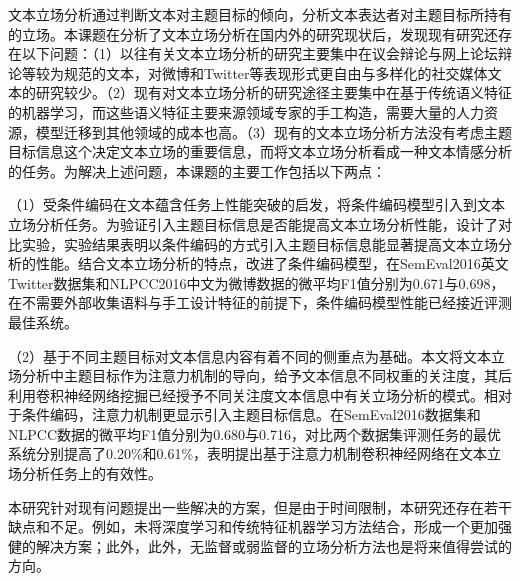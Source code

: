 

文本立场分析通过判断文本对主题目标的倾向，分析文本表达者对主题目标所持有的立场。本课题在分析了文本立场分析在国内外的研究现状后，发现现有研究还存在以下问题：（1）以往有关文本立场分析的研究主要集中在议会辩论与网上论坛辩论等较为规范的文本，对微博和Twitter等表现形式更自由与多样化的社交媒体文本的研究较少。（2）现有对文本立场分析的研究途径主要集中在基于传统语义特征的机器学习，而这些语义特征主要来源领域专家的手工构造，需要大量的人力资源，模型迁移到其他领域的成本也高。（3）现有的文本立场分析方法没有考虑主题目标信息这个决定文本立场的重要信息，而将文本立场分析看成一种文本情感分析的任务。为解决上述问题，本课题的主要工作包括以下两点：

（1）受条件编码在文本蕴含任务上性能突破的启发，将条件编码模型引入到文本立场分析任务。为验证引入主题目标信息是否能提高文本立场分析性能，设计了对比实验，实验结果表明以条件编码的方式引入主题目标信息能显著提高文本立场分析的性能。结合文本立场分析的特点，改进了条件编码模型，在SemEval2016英文Twitter数据集和NLPCC2016中文为微博数据的微平均F1值分别为0.671与0.698，在不需要外部收集语料与手工设计特征的前提下，条件编码模型性能已经接近评测最佳系统。

（2）基于不同主题目标对文本信息内容有着不同的侧重点为基础。本文将文本立场分析中主题目标作为注意力机制的导向，给予文本信息不同权重的关注度，其后利用卷积神经网络挖掘已经授予不同关注度文本信息中有关立场分析的模式。相对于条件编码，注意力机制更显示引入主题目标信息。在SemEval2016数据集和NLPCC数据的微平均F1值分别为0.680与0.716，对比两个数据集评测任务的最优系统分别提高了0.20\%和0.61\%，表明提出基于注意力机制卷积神经网络在文本立场分析任务上的有效性。

本研究针对现有问题提出一些解决的方案，但是由于时间限制，本研究还存在若干缺点和不足。例如，未将深度学习和传统特征机器学习方法结合，形成一个更加强健的解决方案；此外，此外，无监督或弱监督的立场分析方法也是将来值得尝试的方向。